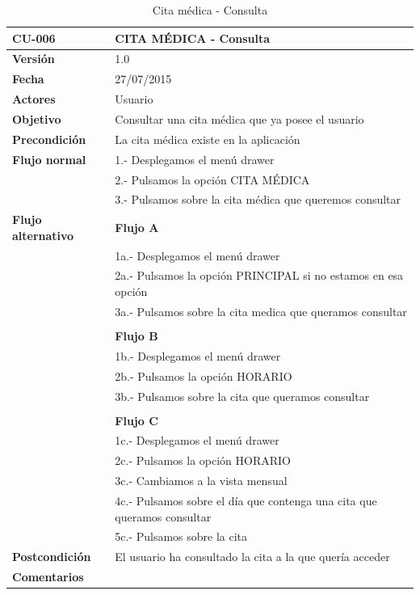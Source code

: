 \documentclass[../pfc.tex]{subfiles}
\begin{document}
		\begin{table}[H]
			\centering
			\begin{tabular}[t]{|p{3cm}|p{9.5cm}|}
				\hline \textbf{CU-006} & \textbf{CITA MÉDICA - Consulta} \\*
				\hline\hline \textbf{Versión} & 1.0 \\*
				\hline\hline \textbf{Fecha} & 27/07/2015 \\*
				\hline\textbf{Actores} 	& Usuario\\*
				\hline \textbf{Objetivo} & Consultar una cita médica que ya posee el usuario\\* 			
				\hline \textbf{Precondición} & La cita médica existe en la aplicación\\* 
				\hline \textbf{Flujo normal} & 1.- Desplegamos el menú drawer \\* 
				& 2.- Pulsamos la opción CITA MÉDICA\\*	
				& 3.- Pulsamos sobre la cita médica que queremos consultar\\*	
				\hline \textbf{Flujo alternativo} & \textbf{Flujo A} \\* 
				& 1a.- Desplegamos el menú drawer \\* 
				& 2a.- Pulsamos la opción PRINCIPAL si no estamos en esa opción\\*	
				& 3a.- Pulsamos sobre la cita medica que queramos consultar\\*	
				& \\*	
				& \textbf{Flujo B} \\* 
				& 1b.- Desplegamos el menú drawer \\* 
				& 2b.- Pulsamos la opción HORARIO\\*	
				& 3b.- Pulsamos sobre la cita que queramos consultar\\*	
				& \\*	
				& \textbf{Flujo C} \\* 
				& 1c.- Desplegamos el menú drawer \\* 
				& 2c.- Pulsamos la opción HORARIO \\*	
				& 3c.- Cambiamos a la vista mensual \\*	
				& 4c.- Pulsamos sobre el día que contenga una cita que queramos consultar\\*	
				& 5c.- Pulsamos sobre la cita\\*		
				\hline \textbf{Postcondición} & El usuario ha consultado la cita a la que quería acceder \\* 
				\hline \textbf{Comentarios}   & \\*
				\hline
			\end{tabular}
			\caption{Cita médica - Consulta}
			\label{tabla:caso006}
		\end{table}
		
\end{document}
